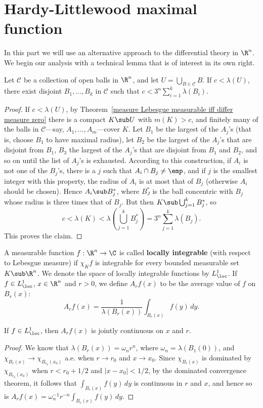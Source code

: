 \section{Hardy-Littlewood maximal function}
In this part we will use an alternative approach to the differential theory in $\R^n$. We begin our analysis with a technical lemma that is of interest in its own right.
\begin{lemma}\label{maximal function cover theorem}
Let $\mathcal{C}$ be a collection of open balls in $\R^n$, and let $U=\bigcup_{B\in\mathcal{C}}B$. If $c<\lambda(U)$, there exist disjoint $B_1,\dots,B_k$ in $\mathcal{C}$ such that $c<3^n\sum_{i=1}^{k}\lambda(B_i)$.
\end{lemma}
\begin{proof}
If $c<\lambda(U)$, by Theorem~\ref{measure Lebesgue measurable iff differ measure zero} there is a compact $K\sub U$ with $m(K)>c$, and finitely many of the balls in $\mathcal{C}$---say, $A_1,\dots,A_m$---cover $K$. Let $B_1$ be the largest of the $A_j$'s (that is, choose $B_1$ to have maximal radius), let $B_2$ be the largest of the $A_j$'s that are disjoint from $B_1$, $B_3$ the largest of the $A_j$'s that are disjoint from $B_1$ and $B_2$, and so on until the list of $A_j$'s is exhausted. According to this construction, if $A_i$ is not one of the $B_j$'s, there is a $j$ such that $A_i\cap B_j\neq\emp$, and if $j$ is the smallest integer with this property, the radius of $A_i$ is at most that of $B_j$ (otherwise $A_i$ should be chosen). Hence $A_i\sub B_j^*$, where $B_J^*$ is the ball concentric with $B_j$ whose radius is three times that of $B_j$. But then $K\sub \bigcup_{j=1}^{k}B_j^*$, so
\[c<\lambda(K)<\lambda(\bigcup_{j=1}^{k}B_j^*)=3^n\sum_{j=1}^{k}\lambda(B_j).\]
This proves the claim.
\end{proof}
A measurable function $f:\R^n\to\C$ is called \textbf{locally integrable} (with respect to Lebesgue measure) if $\chi_Kf$ is integrable for every bounded measurable set $K\sub\R^n$. We denote the space of locally integrable functions by $L_{\loc}^1$. If $f\in L^1_{\loc}$, $x\in\R^n$ and $r>0$, we define $A_rf(x)$ to be the average value of $f$ on $B_r(x)$:
\[A_rf(x)=\frac{1}{\lambda(B_r(x))}\int_{B_r(x)}f(y)\,dy.\]
\begin{lemma}\label{L^1_loc average continuous}
If $f\in L^1_{\loc}$, then $A_rf(x)$ is jointly continuous on $x$ and $r$.
\end{lemma}
\begin{proof}
We know that $\lambda(B_r(x))=\omega_nr^n$, where $\omega_n=\lambda(B_1(0))$, and $\chi_{B_r(x)}\to\chi_{B_{r_0}(x_0)}$ a.e. when $r\to r_0$ and $x\to x_0$. Since $\chi_{B_r(x)}$ is dominated by $\chi_{B_{r_0}(x_0)}$ when $r<r_0+1/2$ and $|x-x_0|<1/2$, by the dominated convergence theorem, it follows that $\int_{B_r(x)}f(y)\,dy$ is continuous in $r$ and $x$, and hence so is $A_rf(x)=\omega_n^{-1}r^{-n}\int_{B_r(x)}f(y)\,dy$.
\end{proof}
